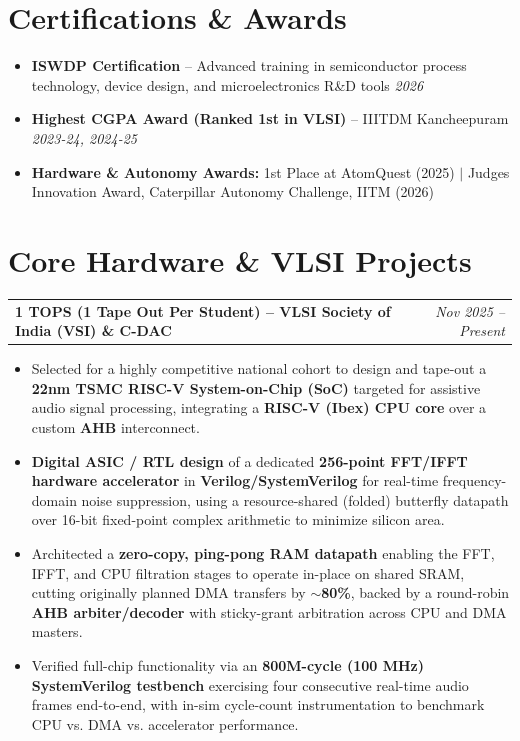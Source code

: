 \documentclass[a4paper,10.5pt]{article}
\begin{document}
\section*{Certifications \& Awards}
\begin{itemize}[leftmargin=1.5em, itemsep=1pt]
    \item \textbf{ISWDP Certification} -- Advanced training in semiconductor process technology, device design, and microelectronics R\&D tools \hfill \textit{2026}
    \item \textbf{Highest CGPA Award (Ranked 1st in VLSI)} -- IIITDM Kancheepuram \hfill \textit{2023-24, 2024-25}
    \item \textbf{Hardware \& Autonomy Awards:} 1st Place at AtomQuest (2025) $\mid$ Judges Innovation Award, Caterpillar Autonomy Challenge, IITM (2026)
\end{itemize}

\section*{Core Hardware \& VLSI Projects}

\noindent
\begin{tabularx}{\linewidth}{@{}X r@{}}
\textbf{1 TOPS (1 Tape Out Per Student) -- VLSI Society of India (VSI) \& C-DAC} & \textit{Nov 2025 -- Present} \\
\end{tabularx}
\begin{itemize}[leftmargin=1.5em, itemsep=1pt]
    \item Selected for a highly competitive national cohort to design and tape-out a \textbf{22nm TSMC RISC-V System-on-Chip (SoC)} targeted for assistive audio signal processing, integrating a \textbf{RISC-V (Ibex) CPU core} over a custom \textbf{AHB} interconnect.
    \item \textbf{Digital ASIC / RTL design} of a dedicated \textbf{256-point FFT/IFFT hardware accelerator} in \textbf{Verilog/SystemVerilog} for real-time frequency-domain noise suppression, using a resource-shared (folded) butterfly datapath over 16-bit fixed-point complex arithmetic to minimize silicon area.
    \item Architected a \textbf{zero-copy, ping-pong RAM datapath} enabling the FFT, IFFT, and CPU filtration stages to operate in-place on shared SRAM, cutting originally planned DMA transfers by \textbf{$\sim$80\%}, backed by a round-robin \textbf{AHB arbiter/decoder} with sticky-grant arbitration across CPU and DMA masters.
    \item Verified full-chip functionality via an \textbf{800M-cycle (100 MHz) SystemVerilog testbench} exercising four consecutive real-time audio frames end-to-end, with in-sim cycle-count instrumentation to benchmark CPU vs. DMA vs. accelerator performance.
\end{itemize}
\end{document}
